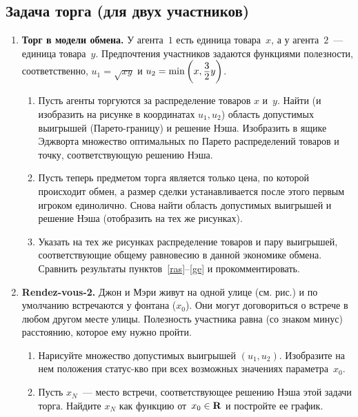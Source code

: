\documentclass[a4paper,12pt]{article}
\def\R{{\bf R}}
\def\dr#1#2{\frac{\displaystyle#1\mathstrut}{\displaystyle#2\mathstrut}}
\begin{document}
\subsection{Задача торга (для двух участников)}

\begin{enumerate}

\item {\bf Торг в модели обмена.} У агента~$1$ есть единица
товара~$x$, а у агента~$2$~--- единица товара~$y$.
Предпочтения участников задаются функциями полезности,
соответственно, $u_1=\sqrt{xy}$ и
$u_2=\min\left(x,\dr{3}{2}y\right)$.

\begin{enumerate}

\item\label{ras} Пусть агенты торгуются за распределение
товаров $x$ и~$y$. Найти (и изобразить на рисунке в
координатах $u_1,u_2$) область допустимых выигрышей
(Парето-границу) и решение Нэша. Изобразить в ящике
Эджворта множество оптимальных по Парето распределений
товаров и точку, соответствующую решению Нэша.

\item\label{p} Пусть теперь предметом торга является только
цена, по которой происходит обмен, а размер сделки
устанавливается после этого первым игроком единолично.
Снова найти область допустимых выигрышей и решение Нэша
(отобразить на тех же рисунках).

\item\label{ge} Указать на тех же рисунках распределение
товаров и пару выигрышей, соответствующие общему равновесию
в данной экономике обмена. Сравнить результаты
пунктов~\ref{ras}--\ref{ge} и прокомментировать.

\end{enumerate}

\item {\bf Rendez-vous-2.} Джон и Мэри живут на одной улице
(см. рис.) и по умолчанию встречаются у фонтана ($x_0$).
Они могут договориться о встрече в любом другом месте
улицы. Полезность участника равна (со знаком минус)
расстоянию, которое ему нужно пройти.

\begin{enumerate}

\item Нарисуйте множество допустимых выигрышей $(u_1,u_2)$.
Изобразите на нем положения статус-кво при всех возможных
значениях параметра~$x_0$.

\item Пусть $x_N$~--- место встречи, соответствующее
решению Нэша этой задачи торга. Найдите $x_N$ как функцию
от~$x_0\in\R$ и постройте ее график.


\end{enumerate}
\end{enumerate}
\end{document}
